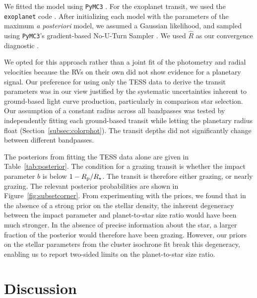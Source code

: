 \documentclass[12pt,twocolumn,tighten]{aastex63}
\begin{document}
We fitted the model using \texttt{PyMC3}
\citep{salvatier_2016_PyMC3,exoplanet:theano}.  For the exoplanet
transit, we used the \texttt{exoplanet} code
\citep{exoplanet:exoplanet}.  After initializing each model with the
parameters of the maximum {\it a posteriori} model, we assumed a
Gaussian likelihood, and sampled using \texttt{PyMC3}'s gradient-based
No-U-Turn Sampler \citep{hoffman_no-u-turn_2014}. We used $\hat{R}$ as
our convergence diagnostic \citep{gelman_inference_1992}.

We opted for this approach rather than a joint fit of the photometry
and radial velocities because the RVs on their own did not show
evidence for a planetary signal.  Our preference for using only the
TESS data to derive the transit parameters was in our view justified
by the systematic uncertainties inherent to ground-based light curve
production, particularly in comparison star selection.  Our assumption
of a constant radius across all bandpasses was tested by independently
fitting each ground-based transit while letting the planetary radius
float (Section~\ref{subsec:colorphot}). The transit depths did not
significantly change between different bandpasses.

The posteriors from fitting the TESS data alone are given in
Table~\ref{tab:posterior}.  The condition for a grazing transit is
whether the impact parameter $b$ is below $1 - R_{\rm p}/R_\star$.  The
transit is therefore either grazing, or nearly grazing.   The relevant
posterior probabilities are shown in Figure~\ref{fig:subsetcorner}.
From experimenting with the priors, we found that in the absence of a
strong prior on the stellar density, the inherent degeneracy between
the impact parameter and planet-to-star size ratio would have been
much stronger.  In the absence of precise information about the star,
a larger fraction of the posterior would therefore have been grazing.
However, our priors on the stellar parameters from the cluster
isochrone fit break this degeneracy, enabling us to report two-sided
limits on the planet-to-star size ratio.




\section{Discussion}
\label{sec:discussion}
\end{document}
